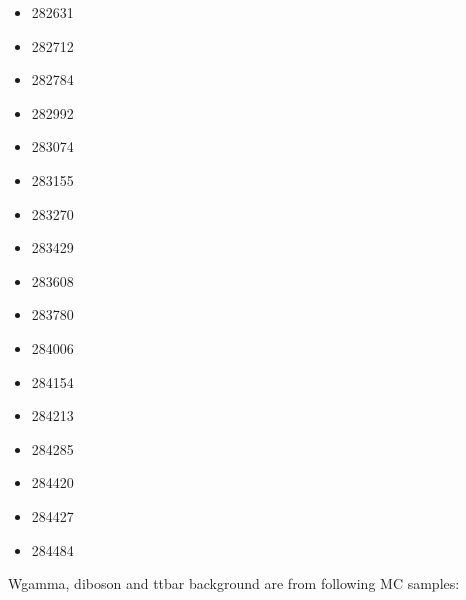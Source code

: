 \begin{itemize}
\item 282631
\item 282712
\item 282784
\item 282992
\item 283074
\item 283155
\item 283270
\item 283429
\item 283608
\item 283780
\item 284006
\item 284154
\item 284213
\item 284285
\item 284420
\item 284427
\item 284484
\end{itemize}
Wgamma, diboson and ttbar background are from following MC samples:\\
